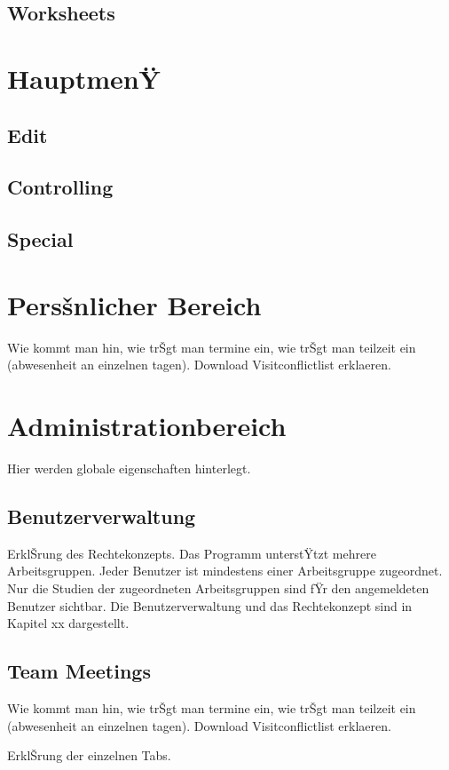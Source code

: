 \documentclass[11pt,oneside]{scrbook}
\begin{document}
\section{Worksheets}
\label{chap:worksheet}

\chapter{HauptmenŸ}
\section{Edit}
\section{Controlling}
\section{Special}


\chapter{Persšnlicher Bereich}
\label{chap:personal}
Wie kommt man hin, wie trŠgt man termine ein, wie trŠgt man teilzeit ein (abwesenheit an einzelnen tagen). Download Visitconflictlist erklaeren.


\chapter{Administrationbereich}
\label{chap:admin}
Hier werden globale eigenschaften hinterlegt.
\section{Benutzerverwaltung}
ErklŠrung des Rechtekonzepts.
Das Programm unterstŸtzt mehrere Arbeitsgruppen. Jeder Benutzer ist mindestens einer Arbeitsgruppe zugeordnet. Nur die Studien  der zugeordneten Arbeitsgruppen sind fŸr den angemeldeten Benutzer sichtbar. Die Benutzerverwaltung und das Rechte\-konzept sind in Kapitel xx dargestellt.

\section{Team Meetings}
Wie kommt man hin, wie trŠgt man termine ein, wie trŠgt man teilzeit ein (abwesenheit an einzelnen tagen). Download Visitconflictlist erklaeren.


ErklŠrung der einzelnen Tabs.
\end{document}
